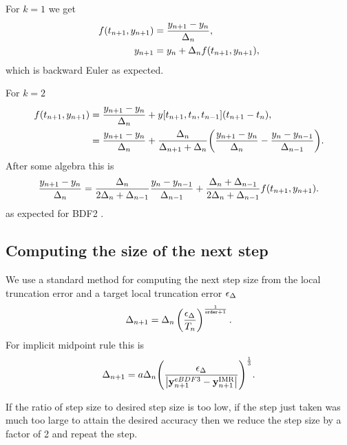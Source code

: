For $k=1$ we get
\begin{equation}
  \begin{aligned}
    f(t_{n+1}, y_{n+1}) &= \frac{y_{n+1} - y_n}{\Delta_{n}}, \\
    y_{n+1} &= y_n + \Delta_{n} f(t_{n+1}, y_{n+1}),
  \end{aligned}
\end{equation}
which is backward Euler as expected.

For $k=2$
\begin{equation}
  \label{eqn:bdf2-derivation}
  \begin{aligned}
    f(t_{n+1}, y_{n+1}) &= \frac{y_{n+1} - y_n}{\Delta_{n}} +  y[t_{n+1}, t_{n}, t_{n-1}](t_{n+1} - t_n), \\
    &= \frac{y_{n+1} - y_n}{\Delta_{n}} +  \frac{\Delta_{n}}{\Delta_{n+1} + \Delta_{n}} {\left( \frac{y_{n+1} - y_n}{\Delta_{n}} - \frac{y_n - y_{n-1}}{\Delta_{n-1}} \right)}. \\
  \end{aligned}
\end{equation}
After some algebra this is
\begin{equation}
  \label{eqn:bdf2-derivation-rearranged}
  \begin{aligned}
    \frac{y_{n+1} - y_n}{\Delta_{n}} = \frac{\Delta_{n}}{2\Delta_{n} + \Delta_{n-1}} \frac{y_n - y_{n-1}}{\Delta_{n-1}} 
    + \frac{\Delta_{n} + \Delta_{n-1}}{2\Delta_{n} + \Delta_{n-1}} f(t_{n+1}, y_{n+1}).
  \end{aligned}
\end{equation}
as expected for BDF2 \cite[pg. 715]{GreshoSani}.


\subsection{Computing the size of the next step}

We use a standard method \cite[pg.268]{GreshoSani} for computing the next step size from the local truncation error and a target local truncation error $\epsilon_{\Delta_{}}$
\begin{equation}
\Delta_{n+1} = \Delta_{n} \left( \frac{\epsilon_{\Delta_{}}}{T_n}  \right) ^{\frac{1}{\texttt{order}+1}}.
\end{equation}
For implicit midpoint rule this is
\begin{equation}
  \Delta_{n+1} = a \Delta_{n} {\left(  \frac{\epsilon_{\Delta_{}}}{\left|{\mathbf{y}_{n+1}^{eBDF3} - \mathbf{y}_{n+1}^{\text{IMR}}} \right|}  \right)}^{\frac{1}{3}}.
\end{equation}

If the ratio of step size to desired step size is too low, \ie if the step just taken was much too large to attain the desired accuracy then we reduce the step size by a factor of 2 and repeat the step.

